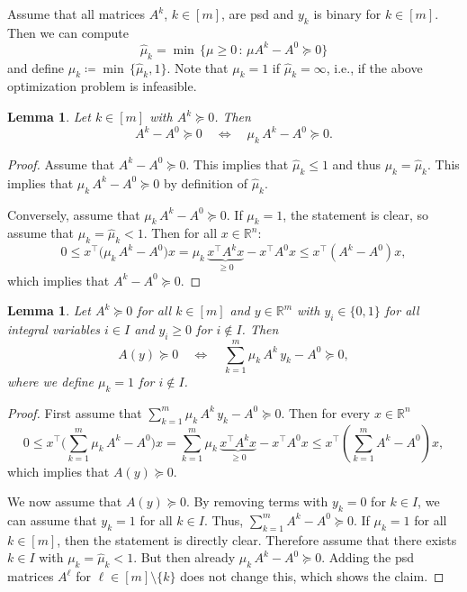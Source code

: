 \documentclass[10pt, a4paper]{article}
\newcommand{\suchthat}{\,:\,}
\newcommand{\define}{\coloneqq}
\newcommand{\T}{^{\top}}
\newcommand{\R}{\mathds{R}}
\newtheorem{lemma}[theorem]{Lemma}
\begin{document}
Assume that all matrices $A^k$, $k \in [m]$, are psd and $y_k$ is binary
for $k \in [m]$. Then we can compute
\begin{equation}\label{eq:ComputeHatMu}
  \hat{\mu}_k = \min\, \{ \mu \geq 0 \suchthat \mu A^k - A^0 \succeq 0\}
\end{equation}
and define $\mu_k \define \min\, \{\hat{\mu}_k, 1\}$. Note that $\mu_k = 1$ if
$\hat{\mu}_k = \infty$, i.e., if the above optimization problem is infeasible.

\begin{lemma}\label{lem:Tightening1}
  Let $k \in [m]$ with $A^k \succeq 0$. Then
  \[
    A^k - A^0 \succeq 0
    \quad\Leftrightarrow\quad
    \mu_k\, A^k - A^0 \succeq 0.
  \]
\end{lemma}

\begin{proof}
  Assume that $A^k - A^0 \succeq 0$. This implies that $\hat{\mu}_k \leq 1$
  and thus $\mu_k = \hat{\mu}_k$. This implies that
  $\mu_k\, A^k - A^0 \succeq 0$ by definition of $\hat{\mu}_k$.

  Conversely, assume that $\mu_k\, A^k - A^0 \succeq 0$. If $\mu_k = 1$, the
  statement is clear, so assume that $\mu_k = \hat{\mu}_k < 1$. Then for
  all $x \in \R^n$:
  \[
    0 \leq x\T \big(\mu_k\, A^k - A^0\big) x = \mu_k\,
    \underbrace{x\T A^k x}_{\geq 0} -
    x\T A^0 x \leq x\T (A^k - A^0) x,
  \]
  which implies that $A^k - A^0 \succeq 0$.
\end{proof}

\begin{lemma}\label{lem:TightenedProblem}
  Let $A^k \succeq 0$ for all $k \in [m]$ and $y \in \R^m$ with
  $y_i \in \{0,1\}$ for all integral variables $i \in I$ and $y_i \geq 0$
  for $i \notin I$. Then
  \[
    A(y) \succeq 0 \quad\Leftrightarrow\quad
    \sum_{k=1}^m \mu_k\, A^k\, y_k - A^0 \succeq 0,
  \]
  where we define $\mu_k = 1$ for $i \notin I$.
\end{lemma}

\begin{proof}
  First assume that
  $\sum_{k=1}^m \mu_k\, A^k\, y_k - A^0 \succeq 0$. Then for every
  $x \in \R^n$
  \[
    0 \leq x\T \bigg(\sum_{k=1}^m \mu_k\, A^k - A^0\bigg) x =
    \sum_{k=1}^m \mu_k\, \underbrace{x\T A^k x}_{\geq 0} -
    x\T A^0 x \leq x\T (\sum_{k=1}^m A^k - A^0) x,
  \]
  which implies that $A(y) \succeq 0$.

  We now assume that $A(y) \succeq 0$. By removing terms with $y_k = 0$ for
  $k \in I$, we can assume that $y_k = 1 $ for all $k \in I$. Thus,
  $\sum_{k=1}^m A^k - A^0 \succeq 0$. If $\mu_k = 1$ for all $k \in [m]$,
  then the statement is directly clear. Therefore assume that there exists
  $k \in I$ with $\mu_k = \hat{\mu}_k < 1$. But then already
  $\mu_k\, A^k - A^0 \succeq 0$. Adding the psd matrices $A^{\ell}$ for
  $\ell \in [m] \setminus \{k\}$ does not change this, which shows the
  claim.
\end{proof}
\end{document}
